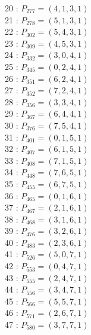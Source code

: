 \documentclass{article}
\begin{document}
{\begin{multicols}{2}
20 : $P_{277}=( 4, 1, 3, 1 )$\\
21 : $P_{278}=( 5, 1, 3, 1 )$\\
22 : $P_{302}=( 5, 4, 3, 1 )$\\
23 : $P_{309}=( 4, 5, 3, 1 )$\\
24 : $P_{332}=( 3, 0, 4, 1 )$\\
25 : $P_{345}=( 0, 2, 4, 1 )$\\
26 : $P_{351}=( 6, 2, 4, 1 )$\\
27 : $P_{352}=( 7, 2, 4, 1 )$\\
28 : $P_{356}=( 3, 3, 4, 1 )$\\
29 : $P_{367}=( 6, 4, 4, 1 )$\\
30 : $P_{376}=( 7, 5, 4, 1 )$\\
31 : $P_{401}=( 0, 1, 5, 1 )$\\
32 : $P_{407}=( 6, 1, 5, 1 )$\\
33 : $P_{408}=( 7, 1, 5, 1 )$\\
34 : $P_{448}=( 7, 6, 5, 1 )$\\
35 : $P_{455}=( 6, 7, 5, 1 )$\\
36 : $P_{465}=( 0, 1, 6, 1 )$\\
37 : $P_{467}=( 2, 1, 6, 1 )$\\
38 : $P_{468}=( 3, 1, 6, 1 )$\\
39 : $P_{476}=( 3, 2, 6, 1 )$\\
40 : $P_{483}=( 2, 3, 6, 1 )$\\
41 : $P_{526}=( 5, 0, 7, 1 )$\\
42 : $P_{553}=( 0, 4, 7, 1 )$\\
43 : $P_{555}=( 2, 4, 7, 1 )$\\
44 : $P_{556}=( 3, 4, 7, 1 )$\\
45 : $P_{566}=( 5, 5, 7, 1 )$\\
46 : $P_{571}=( 2, 6, 7, 1 )$\\
47 : $P_{580}=( 3, 7, 7, 1 )$\\
\end{multicols}
}
\end{document}
